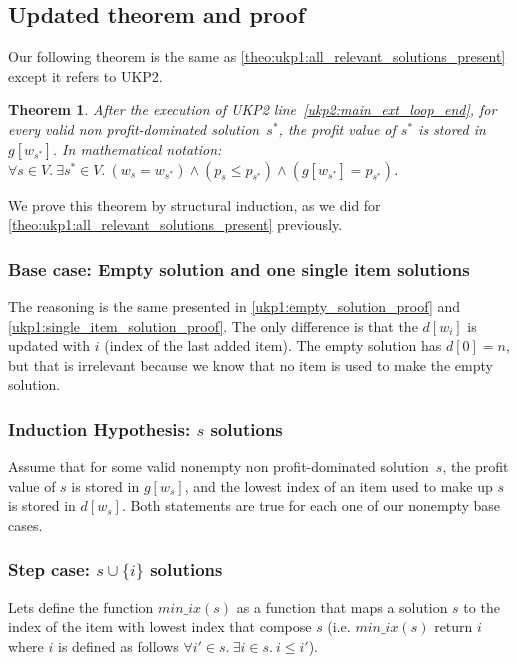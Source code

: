 \documentclass[12pt]{article}
\newtheorem{theorem}{Theorem}
\begin{document}
\subsection{Updated theorem and proof}

Our following theorem is the same as \ref{theo:ukp1:all_relevant_solutions_present} except it refers to UKP2.

\begin{theorem}\label{theo:ukp2:all_relevant_solutions_present}
After the execution of UKP2 line~\ref{ukp2:main_ext_loop_end}, for every valid non profit-dominated solution~\(s^*\), the profit value of \(s^*\) is stored in \(g[w_{s^*}]\). In mathematical notation: \(\forall s \in V.~\exists s^* \in V.~(w_s = w_{s^*}) \land (p_s \leq p_{s^*}) \land (g[w_{s^*}] = p_{s^*})\).
\end{theorem}

We prove this theorem by structural induction, as we did for \autoref{theo:ukp1:all_relevant_solutions_present} previously.

\subsubsection{Base case: Empty solution and one single item solutions}

The reasoning is the same presented in \autoref{ukp1:empty_solution_proof} and \autoref{ukp1:single_item_solution_proof}. The only difference is that the \(d[w_i]\) is updated with \(i\) (index of the last added item). The empty solution has \(d[0] = n\), but that is irrelevant because we know that no item is used to make the empty solution.

\subsubsection{Induction Hypothesis: \(s\) solutions}

Assume that for some valid nonempty non profit-dominated solution~\(s\), the profit value of \(s\) is stored in \(g[w_s]\), and the lowest index of an item used to make up \(s\) is stored in \(d[w_s]\). Both statements are true for each one of our nonempty base cases.

\subsubsection{Step case: \(s \cup \{i\}\) solutions}

Lets define the function \(min\_ix(s)\) as a function that maps a solution \(s\) to the index of the item with lowest index that compose \(s\) (i.e. \(min\_ix(s)\) return \(i\) where \(i\) is defined as follows \(\forall i' \in s.~\exists i \in s.~i \leq i'\)).
\end{document}
